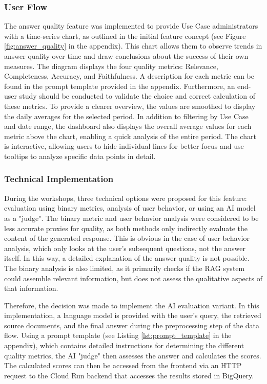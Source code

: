\documentclass[
	english,
	ruledheaders=section,%
	class=report,%
	thesis={type=bachelor},%
	accentcolor=1b,%
	custommargins=true,%
	marginpar=false,%
	parskip=half-,%
	fontsize=11pt,%
	DIV=14,
]{tudapub}
\begin{document}
\subsubsection{User Flow}
The answer quality feature was implemented to provide Use Case administrators with a time-series chart, as outlined in the initial feature concept (see Figure \ref{fig:answer_quality} in the appendix). This chart allows them to observe trends in answer quality over time and draw conclusions about the success of their own measures. The diagram displays the four quality metrics: Relevance, Completeness, Accuracy, and Faithfulness. A description for each metric can be found in the prompt template provided in the appendix. Furthermore, an end-user study should be conducted to validate the choice and correct calculation of these metrics. To provide a clearer overview, the values are smoothed to display the daily averages for the selected period. In addition to filtering by Use Case and date range, the dashboard also displays the overall average values for each metric above the chart, enabling a quick analysis of the entire period. The chart is interactive, allowing users to hide individual lines for better focus and use tooltips to analyze specific data points in detail.

\subsubsection{Technical Implementation}
During the workshops, three technical options were proposed for this feature: evaluation using binary metrics, analysis of user behavior, or using an AI model as a "judge". The binary metric and user behavior analysis were considered to be less accurate proxies for quality, as both methods only indirectly evaluate the content of the generated response. This is obvious in the case of user behavior analysis, which only looks at the user's subsequent questions, not the answer itself. In this way, a detailed explanation of the answer quality is not possible. The binary analysis is also limited, as it primarily checks if the RAG system could assemble relevant information, but does not assess the qualitative aspects of that information.

Therefore, the decision was made to implement the AI evaluation variant. In this implementation, a language model is provided with the user's query, the retrieved source documents, and the final answer during the preprocessing step of the data flow. Using a prompt template (see Listing \ref{lst:prompt_template} in the appendix), which contains detailed instructions for determining the different quality metrics, the AI "judge" then assesses the answer and calculates the scores. The calculated scores can then be accessed from the frontend via an HTTP request to the Cloud Run backend that accesses the results stored in BigQuery.
\end{document}
